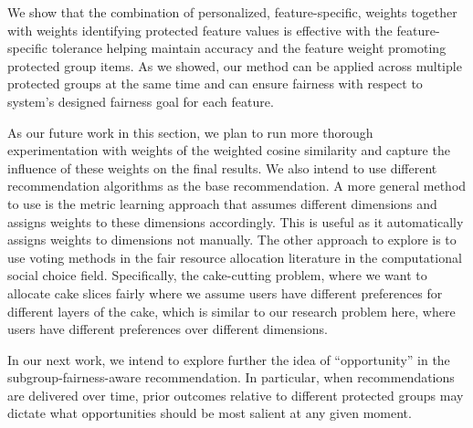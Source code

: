 We show that the combination of personalized, feature-specific, weights together with weights identifying protected feature values is effective with the feature-specific tolerance helping maintain accuracy and the feature weight promoting protected group items. As we showed, our method can be applied across multiple protected groups at the same time and can ensure fairness with respect to system's designed fairness goal for each feature.


As our future work in this section, we plan to run more thorough experimentation with weights of the weighted cosine similarity and capture the influence of these weights on the final results. We also intend to use different recommendation algorithms as the base recommendation. A more general method to use is the metric learning approach that assumes different dimensions and assigns weights to these dimensions accordingly. This is useful as it automatically assigns weights to dimensions not manually.
The other approach to explore is to use voting methods in the fair resource allocation literature in the computational social choice field. Specifically, the cake-cutting problem, where we want to allocate cake slices fairly where we assume users have different preferences for different layers of the cake, which is similar to our research problem here, where users have different preferences over different dimensions.


In our next work, we intend to explore further the idea of ``opportunity'' in the subgroup-fairness-aware recommendation. In particular, when recommendations are delivered over time, prior outcomes relative to different protected groups may dictate what opportunities should be most salient at any given moment. 
